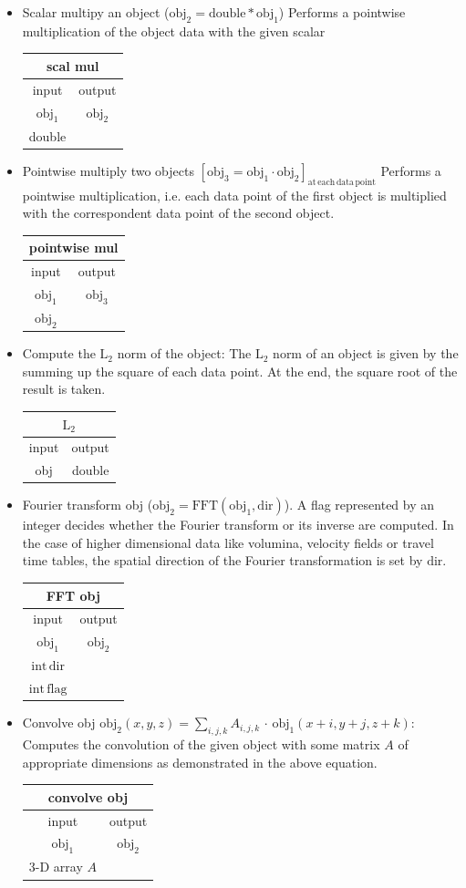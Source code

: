 \documentclass[12pt,a4paper]{article}
\newcommand{\bet}[1]{\begin{center}
		     \begin{tabular}{|c|c|}
		     \hline
		     \multicolumn{2}{|c|}{#1}\\
		     \hline\hline
		     input & output \\
                     \hline}
\newcommand{\eet}{\hline
		  \end{tabular}
		  \end{center}}
\begin{document}
\begin{itemize}
\bet{subtract vol}
$\mathrm{obj}_1$ & $\mathrm{obj}_3$\\
$\mathrm{obj}_2$ & \\
\eet
\item Scalar multipy an object ($\mathrm{obj}_2 = \mathrm{double} * \mathrm{obj}_1$)
\newline
Performs a pointwise multiplication of the object data with the given scalar
\bet{scal mul}
$\mathrm{obj}_1$ & $\mathrm{obj}_2$ \\
double & \\
\eet
\item Pointwise multiply two objects $\left[\mathrm{obj}_3 = \mathrm{obj}_1\cdot \mathrm{obj}_2\right]_{\mathrm{at\,each\,data\,point}}$
\newline
Performs a pointwise multiplication, i.e. each data point of the first object is multiplied 
with the correspondent data point of the second object.  
\bet{pointwise mul}
$\mathrm{obj}_1$ & $\mathrm{obj}_3$\\
$\mathrm{obj}_2$ & \\
\eet
\item Compute the $\mathrm{L}_2$ norm of the object:
\newline
The $\mathrm{L}_2$ norm of an object is given by the summing up the 
square of each data point. At the end, the square root of the result is taken. 
\bet{$\mathrm{L}_2$}
obj & double\\
\eet
\item Fourier transform obj ($\mathrm{obj}_2 = \mathrm{FFT}(\mathrm{obj}_1,\mathrm{dir})$). A flag 
represented by an integer decides whether the Fourier transform or its inverse
are computed. In the case of higher dimensional data like volumina, velocity fields or travel time tables,
the spatial direction of the Fourier transformation is set by $\mathrm{dir}$.
\bet{FFT obj}
$\mathrm{obj}_1$ & $\mathrm{obj}_2$ \\
$\mathrm{int\,dir} $ & \\
$\mathrm{int\,flag}$ & \\
\eet
\item Convolve obj $\mathrm{obj}_2(x,y,z) = \sum_{i,j,k}A_{i,j,k}\,\cdot\,\mathrm{obj}_1(x+i,y+j,z+k)$:
\newline
Computes the convolution of the given object with some matrix $A$ of appropriate dimensions as 
demonstrated in the above equation. 
\bet{convolve obj}
$\mathrm{obj}_1$ & $\mathrm{obj}_2$\\
3-D array $A$ & \\
\eet
\end{itemize}
\end{document}
